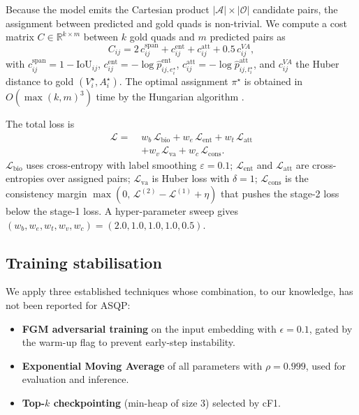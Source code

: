 \documentclass[11pt]{article}
\begin{document}
Because the model emits the Cartesian product
$|\mathcal{A}|\times|\mathcal{O}|$ candidate pairs, the assignment
between predicted and gold quads is non-trivial. We compute a cost
matrix $C\in\mathbb{R}^{k\times m}$ between $k$ gold quads and $m$
predicted pairs as
\begin{equation}
C_{ij} = 2\, c^{\text{span}}_{ij}
       + c^{\text{ent}}_{ij}
       + c^{\text{att}}_{ij}
       + 0.5\, c^{VA}_{ij},
\label{eq:cost}
\end{equation}
with $c^{\text{span}}_{ij} = 1 - \mathrm{IoU}_{ij}$,
$c^{\text{ent}}_{ij} = -\log \hat p^\text{ent}_{ij,e_i^\star}$,
$c^{\text{att}}_{ij} = -\log \hat p^\text{att}_{ij,t_i^\star}$, and
$c^{VA}_{ij}$ the Huber distance to gold $(V_i^\star, A_i^\star)$.
The optimal assignment $\pi^\star$ is obtained in
$O(\max(k,m)^3)$ time by the Hungarian algorithm
\cite{kuhn1955hungarian}.

The total loss is
\begin{equation}
\begin{split}
\mathcal{L} = \;& w_b\,\mathcal{L}_\text{bio}
            + w_e\,\mathcal{L}_\text{ent}
            + w_t\,\mathcal{L}_\text{att} \\
            &+ w_v\,\mathcal{L}_\text{va}
            + w_c\,\mathcal{L}_\text{cons}.
\end{split}
\label{eq:totalloss}
\end{equation}
$\mathcal{L}_\text{bio}$ uses cross-entropy with label smoothing
$\varepsilon{=}0.1$;
$\mathcal{L}_\text{ent}$ and $\mathcal{L}_\text{att}$ are
cross-entropies over assigned pairs;
$\mathcal{L}_\text{va}$ is Huber loss with $\delta{=}1$;
$\mathcal{L}_\text{cons}$ is the consistency margin
$\max(0,\,\mathcal{L}^{(2)}-\mathcal{L}^{(1)}+\eta)$ that pushes the
stage-2 loss below the stage-1 loss. A hyper-parameter sweep gives
$(w_b,w_e,w_t,w_v,w_c)=(2.0,1.0,1.0,1.0,0.5)$.

\subsection{Training stabilisation}
\label{sec:method:train}

We apply three established techniques whose combination, to our
knowledge, has not been reported for ASQP:
\begin{itemize}[itemsep=1pt,topsep=2pt,leftmargin=*]
\item \textbf{FGM adversarial training} \cite{miyato2017adv} on the
      input embedding with $\epsilon=0.1$, gated by the warm-up flag
      to prevent early-step instability.
\item \textbf{Exponential Moving Average} of all parameters with
      $\rho=0.999$, used for evaluation and inference.
\item \textbf{Top-$k$ checkpointing} (min-heap of size 3) selected by
      cF1.
\end{itemize}
\end{document}
